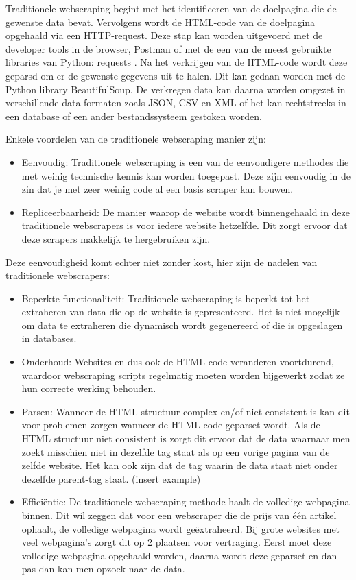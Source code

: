 Traditionele webscraping begint met het identificeren van de doelpagina die de gewenste data bevat. Vervolgens wordt de HTML-code van de doelpagina opgehaald via een HTTP-request. Deze stap kan worden uitgevoerd met de developer tools  in de browser, Postman of met de een van de meest gebruikte libraries van Python: requests \autocite{Nate2023}.  Na het verkrijgen van de HTML-code wordt deze geparsd om er de gewenste gegevens uit te halen. Dit kan gedaan worden met de Python library BeautifulSoup. De verkregen data kan daarna worden omgezet in verschillende data formaten zoals JSON, CSV en XML of het kan rechtstreeks  in een database of een ander bestandssysteem gestoken worden.

Enkele voordelen van de traditionele webscraping manier zijn:
\begin{itemize}
    \item Eenvoudig: Traditionele webscraping is een van de eenvoudigere methodes die met weinig technische kennis kan worden toegepast. Deze zijn eenvoudig in de zin dat je met zeer weinig code al een basis scraper kan bouwen.
    \item Repliceerbaarheid: De manier waarop de website wordt binnengehaald in deze traditionele webscrapers is voor iedere website hetzelfde. Dit zorgt ervoor dat deze scrapers makkelijk te hergebruiken zijn.
\end{itemize}

Deze eenvoudigheid komt echter niet zonder kost, hier zijn de nadelen van traditionele webscrapers:

\begin{itemize}
    \item Beperkte functionaliteit: Traditionele webscraping is beperkt tot het extraheren van data die op de website is gepresenteerd. Het is niet mogelijk om data te extraheren die dynamisch wordt gegenereerd of die is opgeslagen in databases.
    \item Onderhoud: Websites en dus ook de HTML-code veranderen voortdurend, waardoor webscraping scripts regelmatig moeten worden bijgewerkt zodat ze hun correcte werking behouden.
    \item Parsen: Wanneer de HTML structuur complex en/of niet consistent is kan dit voor problemen zorgen wanneer de HTML-code geparset wordt. Als de HTML structuur niet consistent is zorgt dit ervoor dat de data waarnaar men zoekt misschien niet in dezelfde tag staat als op een vorige pagina van de zelfde website. Het kan ook zijn dat de tag waarin de data staat niet onder dezelfde parent-tag staat.  (insert example)
    \item Efficiëntie: De traditionele webscraping methode haalt de volledige webpagina binnen. Dit wil zeggen dat voor een webscraper die de prijs van één artikel ophaalt, de volledige webpagina wordt geëxtraheerd. Bij grote websites met veel webpagina's zorgt dit op 2 plaatsen voor vertraging. Eerst moet deze volledige webpagina opgehaald worden, daarna wordt deze geparset en dan pas dan kan men opzoek naar de data.
\end{itemize}

